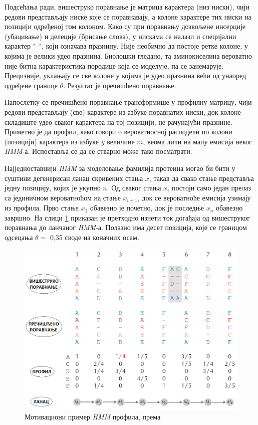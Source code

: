 \documentclass[12pt,oneside]{memoir}
\begin{document}
\begin{CJK}{UTF8}{ipxm}
Подсећања ради, вишеструко поравнање је матрица карактера (низ ниски), чији редови представљају ниске које се поравнавају, а колоне карактере тих ниски на позицији одређеној том колоном. Како су при поравнању дозвољене инсерције (убацивање) и делеције (брисање слова), у нискама се налази и специјални карактер "--", који означава празнину. Није необично да постоје ретке колоне, у којима је велики удео празнина. Биолошки гледано, та аминокиселина вероватно није битна карактеристика породице која се моделује, па се занемарује. Прецизније, уклањају се све колоне у којима је удео празнина већи од унапред одређене границе $\theta$. Резултат је пречишћено поравнање.

Напослетку се пречишћено поравнање трансформише у профилну матрицу, чији редови представљају (све) карактере из азбуке поравнатих ниски, док колоне складиште удео сваког карактера на тој позицији, не рачунајући празнине. Приметно је да профил, како говори о вероватносној расподели по колони (позицији) карактера из азбуке $y$ величине $m$, веома личи на мапу емисија неког \textit{HMM}-а. Испоставља се да се стварно може тако посматрати.

Најједноставнији \textit{HMM} за моделовање фамилија протеина могао би бити у суштини дегенерисан ланац скривених стања $x$, такав да свако стање представља једну позицију, којих је укупно $n$. Од сваког стања $x_i$ постоји само један прелаз са јединичном вероватноћом на стање $x_{i+1}$, док се вероватноће емисија узимају из профила. Прво стање $x_1$ обавезно је почетно, док је последње $x_n$ обавезно завршно. На слици \ref{fig:profil} приказан је претходно изнети ток догађаја од вишеструког поравнања до ланчаног \textit{HMM}-а. Полазно има десет позиција, које се границом одсецања $\theta =$ 0,35 своде на коначних осам.

\begin{figure}[H]
  \centering
  \includegraphics[width=\textwidth]{profil.png}
  \caption{Мотивациони пример \textit{HMM} профила, према \cite{compeau2015}}
  \label{fig:profil}
\end{figure}


\end{CJK}
\end{document}
